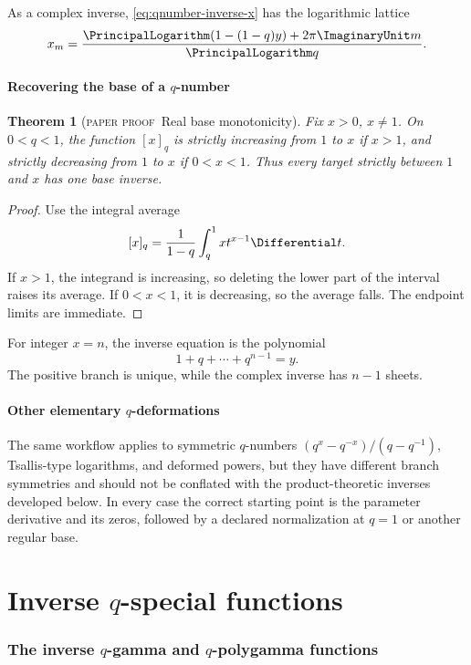\documentclass[11pt,oneside]{article}
\newtheorem{theorem}{Theorem}[section]
\theoremstyle{definition}
\theoremstyle{remark}
\theoremstyle{plain}
\theoremstyle{definition}
\theoremstyle{remark}
\newcommand{\statusproved}{\textcolor{provedgreen}{\textsc{paper proof}}}
\numberwithin{equation}{section}
\numberwithin{figure}{section}
\numberwithin{table}{section}
\let\reporttopsection\section
\let\reportsubsection\subsection
\let\reportsubsubsection\subsubsection
\let\chapter\reporttopsection
\let\section\reportsubsection
\let\subsection\reportsubsubsection
\begin{document}
As a complex inverse, \eqref{eq:qnumber-inverse-x} has the logarithmic lattice
\[
 x_m=\frac{\PrincipalLogarithm(1-(1-q)y)+2\pi\ImaginaryUnit m}{\PrincipalLogarithm q}.
\]

\section{Recovering the base of a \texorpdfstring{\(q\)}{q}-number}
\begin{theorem}[\statusproved\ Real base monotonicity]
Fix \(x>0\), \(x\ne1\).  On \(0<q<1\), the function \([x]_q\) is strictly
increasing from \(1\) to \(x\) if \(x>1\), and strictly decreasing from \(1\)
to \(x\) if \(0<x<1\).  Thus every target strictly between \(1\) and \(x\)
has one base inverse.
\end{theorem}
\begin{proof}
Use the integral average
\[
 [x]_q=\frac1{1-q}\int_q^1xt^{x-1}\Differential t.
\]
If \(x>1\), the integrand is increasing, so deleting the lower part of the
interval raises its average.  If \(0<x<1\), it is decreasing, so the average
falls.  The endpoint limits are immediate.
\end{proof}

For integer \(x=n\), the inverse equation is the polynomial
\[
 1+q+\cdots+q^{n-1}=y.
\]
The positive branch is unique, while the complex inverse has \(n-1\) sheets.

\section{Other elementary \texorpdfstring{\(q\)}{q}-deformations}
The same workflow applies to symmetric \(q\)-numbers
\((q^x-q^{-x})/(q-q^{-1})\), Tsallis-type logarithms, and deformed powers, but
they have different branch symmetries and should not be conflated with the
product-theoretic inverses developed below.  In every case the correct starting
point is the parameter derivative and its zeros, followed by a declared
normalization at \(q=1\) or another regular base.

\part{Inverse \texorpdfstring{\(q\)}{q}-special functions}

\chapter{The inverse \texorpdfstring{\(q\)}{q}-gamma and \texorpdfstring{\(q\)}{q}-polygamma functions}
\end{document}
